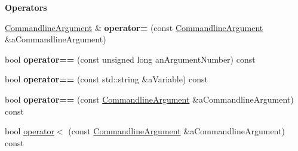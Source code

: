 \begin{Indent}{\bf Operators}\par
\begin{DoxyCompactItemize}
\item 
\hyperlink{class_application_1_1_commandline_argument}{Commandline\+Argument} \& {\bfseries operator=} (const \hyperlink{class_application_1_1_commandline_argument}{Commandline\+Argument} \&a\+Commandline\+Argument)\hypertarget{class_application_1_1_commandline_argument_ae25c8fc78be1916eb7f1d318bcafb522}{}\label{class_application_1_1_commandline_argument_ae25c8fc78be1916eb7f1d318bcafb522}

\item 
bool {\bfseries operator==} (const unsigned long an\+Argument\+Number) const \hypertarget{class_application_1_1_commandline_argument_a1c091987640031464672fa515f697d3c}{}\label{class_application_1_1_commandline_argument_a1c091987640031464672fa515f697d3c}

\item 
bool {\bfseries operator==} (const std\+::string \&a\+Variable) const \hypertarget{class_application_1_1_commandline_argument_afba9475a894dd299642db8d7f040a0bf}{}\label{class_application_1_1_commandline_argument_afba9475a894dd299642db8d7f040a0bf}

\item 
bool {\bfseries operator==} (const \hyperlink{class_application_1_1_commandline_argument}{Commandline\+Argument} \&a\+Commandline\+Argument) const \hypertarget{class_application_1_1_commandline_argument_a1e4be92ec312c792b41aab43c4e5bbc5}{}\label{class_application_1_1_commandline_argument_a1e4be92ec312c792b41aab43c4e5bbc5}

\item 
bool \hyperlink{class_application_1_1_commandline_argument_a0359940fe4dae2674f7a59525809db60}{operator$<$} (const \hyperlink{class_application_1_1_commandline_argument}{Commandline\+Argument} \&a\+Commandline\+Argument) const 
\end{DoxyCompactItemize}
\end{Indent}
